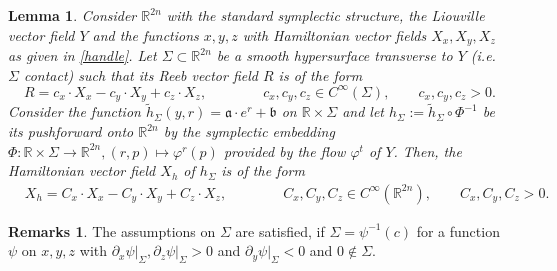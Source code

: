 \documentclass[a4paper,12pt,bibliography=totocnumbered,titlepage=false,abstracton,bookmarksnumbered=true]{scrartcl}
\newtheorem{lemme}[defn]{Lemma}
\theoremstyle{definition}
\newtheorem*{rem}{Remarks}
\begin{document}
\begin{lemme}\label{lemHamilt}
 Consider $\mathbb{R}^{2n}$ with the standard symplectic structure, the Liouville vector field $Y$  and the functions $x,y,z$ with Hamiltonian vector fields $X_x,X_y,X_z$ as given in \ref{handle}. Let $\Sigma\subset\mathbb{R}^{2n}$ be a smooth hypersurface transverse to $Y$ (i.e.\ $\Sigma$ contact) such that its Reeb vector field $R$ is of the form 
 \[R=c_x{\cdot} X_x-c_y{\cdot} X_y + c_z{\cdot} X_z,\qquad\qquad c_x,c_y,c_z \in C^\infty(\Sigma),\qquad c_x,c_y,c_z>0.\]
 Consider the function $\tilde{h}_\Sigma(y,r)=\mathfrak{a}{\cdot} e^r+\mathfrak{b}$ on $\mathbb{R}\times\Sigma$ and let $h_\Sigma:=\tilde{h}_\Sigma\circ \Phi^{-1}$ be its pushforward onto $\mathbb{R}^{2n}$ by the symplectic embedding $\Phi:\mathbb{R}\times\Sigma\rightarrow\mathbb{R}^{2n}, (r,p)\mapsto \varphi^r(p)$ provided by the flow $\varphi^t$ of $Y$. Then, the Hamiltonian vector field $X_h$ of $h_\Sigma$ is of the form
 \begin{align*}
  &X_h=C_x{\cdot} X_x - C_y{\cdot} X_y + C_z{\cdot} X_z,\qquad\qquad C_x,C_y,C_z\in C^{\infty}(\mathbb{R}^{2n}),\qquad C_x,C_y,C_z>0.
 \end{align*}
\end{lemme}
\begin{rem}
The assumptions on $\Sigma$ are satisfied, if $\Sigma=\psi^{-1}(c)$ for a function $\psi$ on $x,y,z$ with $\partial_x \psi\big|_\Sigma,\partial_z \psi\big|_\Sigma>0$ and $\partial_y \psi\big|_\Sigma<0$ and $0\not\in\Sigma$.
\end{rem}
\end{document}

